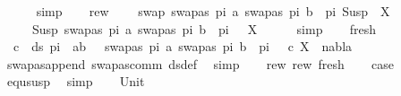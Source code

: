 \begin{isabellebody}
\ \ \ \ \isamarkupfalse%
\ simp\isanewline
\ \ \isamarkupfalse%
\ rew{}{\isacharcolon}{\kern0pt}\isanewline
\ \ \ \ {\isachardoublequoteopen}swap\ {\isacharparenleft}{\kern0pt}{\isacharbrackleft}{\kern0pt}{\isacharparenleft}{\kern0pt}swapas\ pi\ a{\isacharcomma}{\kern0pt}\ swapas\ pi\ b{\isacharparenright}{\kern0pt}{\isacharbrackright}{\kern0pt}\ {\isacharat}{\kern0pt}\ pi{\isacharparenright}{\kern0pt}\ {\isacharparenleft}{\kern0pt}Susp\ {\isasympi}{\isacharprime}{\kern0pt}\ X{\isacharparenright}{\kern0pt}\ \isanewline
\ \ \ \ {\isacharequal}{\kern0pt}\ Susp\ {\isacharparenleft}{\kern0pt}{\isacharbrackleft}{\kern0pt}{\isacharparenleft}{\kern0pt}swapas\ pi\ a{\isacharcomma}{\kern0pt}\ swapas\ pi\ b{\isacharparenright}{\kern0pt}{\isacharbrackright}{\kern0pt}\ {\isacharat}{\kern0pt}\ pi\ {\isacharat}{\kern0pt}\ {\isasympi}{\isacharprime}{\kern0pt}{\isacharparenright}{\kern0pt}\ X{\isachardoublequoteclose}\isanewline
\ \ \ \ \isamarkupfalse%
\ simp\isanewline
\ \ \isamarkupfalse%
\ fresh{\isacharcolon}{\kern0pt}\isanewline
\ \ {\isachardoublequoteopen}{\isasymforall}c\ {\isasymin}\ ds\ {\isacharparenleft}{\kern0pt}pi\ {\isacharat}{\kern0pt}\ {\isacharbrackleft}{\kern0pt}{\isacharparenleft}{\kern0pt}a{\isacharcomma}{\kern0pt}b{\isacharparenright}{\kern0pt}{\isacharbrackright}{\kern0pt}\ {\isacharat}{\kern0pt}\ {\isasympi}{\isacharprime}{\kern0pt}{\isacharparenright}{\kern0pt}\ {\isacharparenleft}{\kern0pt}{\isacharbrackleft}{\kern0pt}{\isacharparenleft}{\kern0pt}swapas\ pi\ a{\isacharcomma}{\kern0pt}\ swapas\ pi\ b{\isacharparenright}{\kern0pt}{\isacharbrackright}{\kern0pt}\ {\isacharat}{\kern0pt}\ pi\ {\isacharat}{\kern0pt}\ {\isasympi}{\isacharprime}{\kern0pt}{\isacharparenright}{\kern0pt}{\isachardot}{\kern0pt}\ {\isacharparenleft}{\kern0pt}c{\isacharcomma}{\kern0pt}\ X{\isacharparenright}{\kern0pt}\ {\isasymin}\ nabla{\isachardoublequoteclose}\isanewline
\ \ \ \ \isamarkupfalse%
\ swapas{\isacharunderscore}{\kern0pt}append\ swapas{\isacharunderscore}{\kern0pt}comm\ ds{\isacharunderscore}{\kern0pt}def\ \isamarkupfalse%
\ simp\isanewline
\ \ \isamarkupfalse%
\ rew{}\ rew{}\ fresh\isanewline
\ \ \isamarkupfalse%
\ {\isacharquery}{\kern0pt}case\isanewline
\ \ \ \ \isamarkupfalse%
\ equ{\isacharunderscore}{\kern0pt}susp\ \isamarkupfalse%
\ simp\isanewline
{}\isamarkupfalse%
\isanewline
\ \ \isamarkupfalse%
\ Unit\isanewline
\ \ \isamarkupfalse%

\end{isabellebody}
